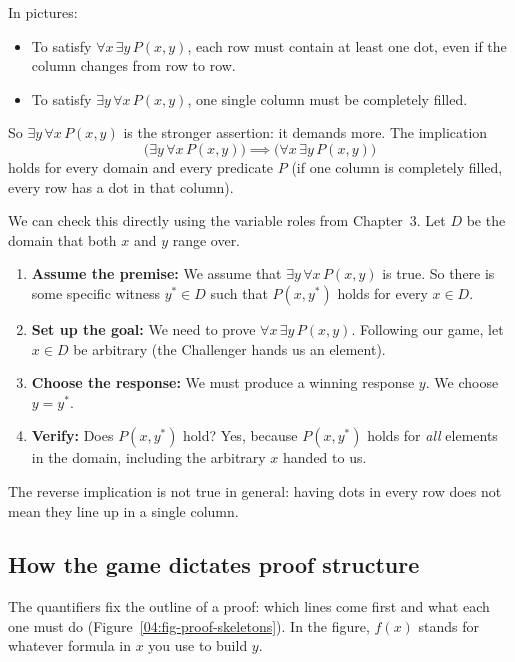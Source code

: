In pictures:
\begin{itemize}
\item To satisfy $\forall x \, \exists y \, P(x, y)$, each row must contain at least one dot, even if the column changes from row to row.
\item To satisfy $\exists y \, \forall x \, P(x, y)$, one single column must be completely filled.
\end{itemize}

So $\exists y \, \forall x \, P(x, y)$ is the stronger assertion: it demands more. The implication
\[
\bigl(\exists y \, \forall x \, P(x, y)\bigr) \implies \bigl(\forall x \, \exists y \, P(x, y)\bigr)
\]
holds for every domain and every predicate $P$ (if one column is completely filled, every row has a dot in that column).

We can check this directly using the variable roles from Chapter~3. Let $D$ be the domain that both $x$ and $y$ range over.
\begin{enumerate}
\item \textbf{Assume the premise:} We assume that $\exists y \, \forall x \, P(x, y)$ is true. So there is some specific witness $y^* \in D$ such that $P(x, y^*)$ holds for every $x \in D$.
\item \textbf{Set up the goal:} We need to prove $\forall x \, \exists y \, P(x, y)$. Following our game, let $x \in D$ be arbitrary (the Challenger hands us an element).
\item \textbf{Choose the response:} We must produce a winning response $y$. We choose $y = y^*$.
\item \textbf{Verify:} Does $P(x, y^*)$ hold? Yes, because $P(x, y^*)$ holds for \emph{all} elements in the domain, including the arbitrary $x$ handed to us.
\end{enumerate}
The reverse implication is not true in general: having dots in every row does not mean they line up in a single column.

\subsection{How the game dictates proof structure}

The quantifiers fix the outline of a proof: which lines come first and what each one must do (Figure~\ref{04:fig-proof-skeletons}). In the figure, $f(x)$ stands for whatever formula in $x$ you use to build $y$.

